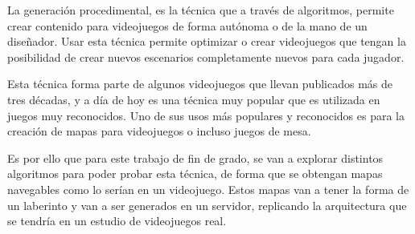 
La generación procedimental, es la técnica que a través de algoritmos, permite crear contenido para videojuegos de forma autónoma o de la mano de un diseñador. 
Usar esta técnica permite optimizar o crear videojuegos que tengan la posibilidad de crear nuevos escenarios completamente nuevos para cada jugador.

Esta técnica forma parte de algunos videojuegos que llevan publicados más de tres décadas, y a día de hoy es una técnica muy popular que es utilizada en juegos muy reconocidos. Uno de sus usos más populares y reconocidos es para la creación de mapas para videojuegos o incluso juegos de mesa. 

Es por ello que para este trabajo de fin de grado, se van a explorar distintos algoritmos para poder probar esta técnica, de forma que se obtengan mapas navegables como lo serían en un videojuego. Estos mapas van a tener la forma de un laberinto y van a ser generados en un servidor, replicando la arquitectura que se tendría en un estudio de videojuegos real.


